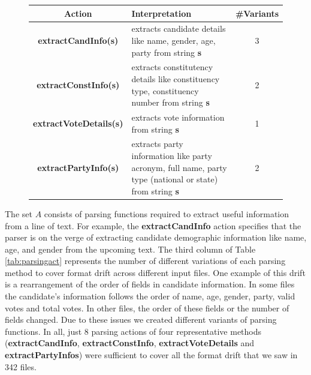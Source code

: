 \begin{figure}[h]
\begin{tabular}{|c|l|c|} 
 \hline
 \textbf{Action} & \textbf{Interpretation}& \textbf{\#Variants} \\\hline
 \textbf{extractCandInfo(s)} & \multicolumn{1}{m{3cm}|}{extracts candidate details like name, gender, age, party from string \textbf{s}} &3 \\\hline 
 \textbf{extractConstInfo(s)} & \multicolumn{1}{m{3cm}|}{extracts constitutency details like constituency type, constituency number from  string  \textbf{s}}  & 2 \\\hline
 \textbf{extractVoteDetails(s)} & \multicolumn{1}{m{3cm}|}{extracts vote information from string \textbf{s}} & 1 \\\hline
 \textbf{extractPartyInfo(s)} & \multicolumn{1}{m{3cm}|}{extracts party information like party acronym, full name, party type (national or state) from string \textbf{s}} & 2\\\hline
\end{tabular}

\end{figure}

The set $A$ consists of parsing functions required to extract useful information from a line of text. For example, the \textbf{extractCandInfo} action specifies that the parser is on the verge of extracting candidate demographic information like name, age, and gender from the upcoming text. The third column of Table \ref{tab:parsingact} represents the number of different variations of each parsing method to cover format drift across different input files. One example of this drift is a rearrangement of the order of fields in candidate information. In some files the candidate's information follows the order of name, age, gender, party, valid votes and total votes. In other files, the order of these fields or the number of fields changed. Due to these issues we created different variants of parsing functions. In all, just 8 parsing actions of four representative methods (\textbf{extractCandInfo}, \textbf{extractConstInfo}, \textbf{extractVoteDetails} and \textbf{extractPartyInfos}) were sufficient to cover all the format drift that we saw in 342 files. 

